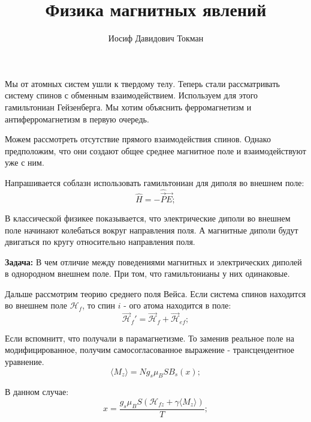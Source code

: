 \documentclass[a4paper, 14pt, russian]{article}
\title{Физика магнитных явлений}
\author{Иосиф Давидович Токман}
\date{}
\newcommand{\be}{\begin{equation}}
\newcommand{\ee}{\end{equation}}
\begin{document}
	\maketitle

	Мы от атомных систем ушли к твердому телу. Теперь стали рассматривать систему
	спинов с обменным взаимодействием. Используем для этого гамильтониан Гейзенберга.
	Мы хотим объяснить ферромагнетизм и антиферромагнетизм в первую очередь.

	Можем рассмотреть отсутствие прямого взаимодействия спинов. Однако предположим,
	что они создают общее среднее магнитное поле и взаимодействуют уже с ним.

	Напрашивается соблазн использовать гамильтониан для диполя во внешнем поле:
	\be
		\hat H = - \hat{\vec P} \vec E;
	\ee

	В классической физикее показывается, что электрические диполи во внешнем 
	поле начинают колебаться вокруг направления поля. А магнитные диполи будут двигаться
	по кругу относительно направления поля.

	\begin{tcolorbox}
		\textbf{Задача:} В чем отличие между поведениями магнитных и электрических диполей 
		в однородном внешнем поле. При том, что гамильтонианы у них одинаковые.
	\end{tcolorbox}

	Дальше рассмотрим теорию среднего поля Вейса. Если система спинов находится 
	во внешнем поле $\mathcal{H}_f$, то спин $i$ - ого атома находится в поле:
	\be
		\label{eq98}
		\vec{\mathcal H}_f ' = \vec{\mathcal H}_f + \vec{\mathcal H}_{ef};
	\ee

	Если вспомнитт, что получали в парамагнетизме. То заменив реальное поле на модифицированное,
	получим самосогласованное выражение - трансцендентное уравнение.
	\be
		\label{eq99}
		\langle M_z \rangle  = N g_s \mu_B S B_s(x);
	\ee

	В данном случае:
	\be
		x = \frac{g_s \mu_B S(\mathcal{H}_{fz} + \gamma \langle M_z \rangle)}{T};
	\ee
\end{document}
